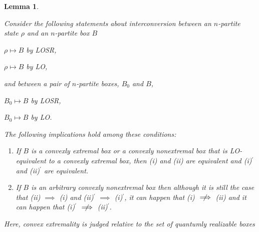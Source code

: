 \documentclass[12pt]{article}
\theoremstyle{plain}
\newtheorem{lem}[theo]{Lemma}
\theoremstyle{definition}
\newcommand{\nimplies}{\centernot{\implies}}
\begin{document}
  
\begin{lem}
\begin{samepage}
    \label{convext}
    Consider the following statements about interconversion between an $n$-partite state $\rho$ and an $n$-partite box $B$
    \begin{compactenum}[(i)]
        \item  $\rho \mapsto B$ by LOSR,
        \item  $\rho \mapsto B$ by LO,
    \end{compactenum}
    and between a pair of $n$-partite boxes,  $B_0$ and $B$,
        \begin{compactenum}[(i)]
        \item[(i)$^{\prime}$]  $B_0 \mapsto B$ by LOSR,
        \item[(ii)$^{\prime}$]  $B_0 \mapsto B$ by LO.
    \end{compactenum}
The following implications hold among these conditions:
\end{samepage}
 \begin{enumerate}
 \item[(a)] If $B$ is a convexly extremal box or a convexly nonextremal box that is LO-equivalent to a convexly extremal box,
    then  (i) and (ii) are equivalent and (i)$^{\prime}$ and (ii)$^{\prime}$ are equivalent. 
\item[(b)] If $B$ is an arbitrary convexly nonextremal box 
 then although it is still the case that (ii) $\implies$ (i) and (ii)$^{\prime}$ $\implies$ (i)$^{\prime}$, it can happen that (i) $\nimplies$ (ii) and it can happen that (i)$^{\prime}$ $\nimplies$ (ii)$^{\prime}$.
 \end{enumerate} 
 Here, convex extremality is judged relative to the set of quantumly realizable boxes 
\end{lem}
\end{document}
